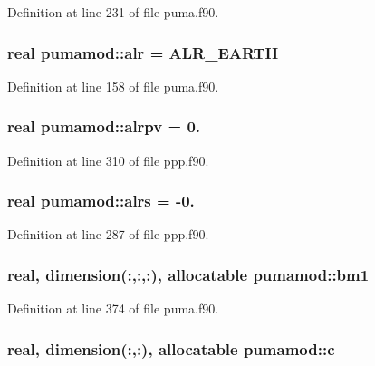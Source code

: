 \-Definition at line 231 of file puma.\-f90.

\hypertarget{classpumamod_a16fd3c35a535517745304e4e978dad36}{
\subsubsection[{alr}]{\setlength{\rightskip}{0pt plus 5cm}real {\bf pumamod\-::alr} = \-A\-L\-R\-\_\-\-E\-A\-R\-T\-H}}
\label{classpumamod_a16fd3c35a535517745304e4e978dad36}


\-Definition at line 158 of file puma.\-f90.

\hypertarget{classpumamod_aaf1e5289f2d9067fb27ac9ac6a07e554}{
\subsubsection[{alrpv}]{\setlength{\rightskip}{0pt plus 5cm}real {\bf pumamod\-::alrpv} = 0.}}
\label{classpumamod_aaf1e5289f2d9067fb27ac9ac6a07e554}


\-Definition at line 310 of file ppp.\-f90.

\hypertarget{classpumamod_acc7c9a43a2f8163077730a971e145878}{
\subsubsection[{alrs}]{\setlength{\rightskip}{0pt plus 5cm}real {\bf pumamod\-::alrs} = -\/0.}}
\label{classpumamod_acc7c9a43a2f8163077730a971e145878}


\-Definition at line 287 of file ppp.\-f90.

\hypertarget{classpumamod_abc2d5c00d5e5856e8cbc8ed5bee74d11}{
\subsubsection[{bm1}]{\setlength{\rightskip}{0pt plus 5cm}real, dimension(\-:,\-:,\-:), allocatable {\bf pumamod\-::bm1}}}
\label{classpumamod_abc2d5c00d5e5856e8cbc8ed5bee74d11}


\-Definition at line 374 of file puma.\-f90.

\hypertarget{classpumamod_a273a105c71e26860f1f83ca28020bbda}{
\subsubsection[{c}]{\setlength{\rightskip}{0pt plus 5cm}real, dimension(\-:,\-:), allocatable {\bf pumamod\-::c}}}
\label{classpumamod_a273a105c71e26860f1f83ca28020bbda}


